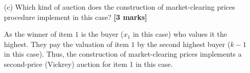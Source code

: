 \begin{enumerate}
\begin{proof}
    \end{proof}

    \item[(c)] Which kind of auction does the construction of market-clearing prices procedure implement in this case?  \hfill{\bf [3 marks]}\smallskip

    As the winner of item $1$ is the buyer ($x_1$ in this case) who values it the highest.
    They pay the valuation of item $1$ by the second highest buyer ($k - 1$ in this case). 
    Thus, the construction of market-clearing prices implements a second-price (Vickrey) auction for item 1 in this case.

\end{enumerate}
